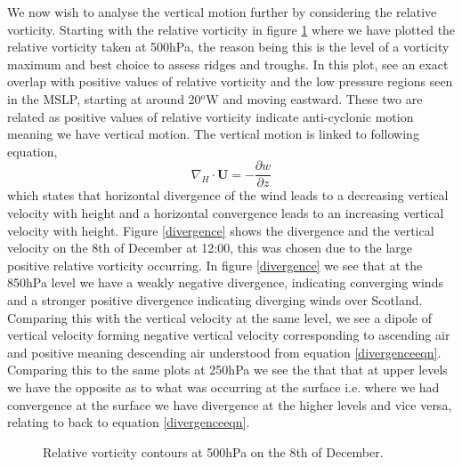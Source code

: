 \documentclass[12pt,a4paper]{article}
\begin{document}
We now wish to analyse the vertical motion further by considering the relative vorticity. Starting with the relative vorticity in figure \ref{relative vorticity} where we have plotted the relative vorticity taken at 500hPa, the reason being this is the level of a vorticity maximum and best choice to assess ridges and troughs. In this plot, see an exact overlap with positive values of relative vorticity and the low pressure regions seen in the MSLP, starting at around 20$^o$W and moving eastward. These two are related as positive values of relative vorticity indicate anti-cyclonic motion meaning we have vertical motion. The vertical motion is linked to following equation,
\begin{equation}
    \nabla_H \cdot\bm{U} = -\frac{\partial w}{\partial z}
    \label{divergenceeqn}
\end{equation}
which states that horizontal divergence of the wind leads to a decreasing vertical velocity with height and a horizontal convergence leads to an increasing vertical velocity with height. Figure \ref{divergence} shows the divergence and the vertical velocity on the 8th of December at 12:00, this was chosen due to the large positive relative vorticity occurring. In figure \ref{divergence} we see that at the 850hPa level we have a weakly negative divergence, indicating converging winds and a stronger positive divergence indicating diverging winds over Scotland. Comparing this with the vertical velocity at the same level, we see a dipole of vertical velocity forming negative vertical velocity corresponding to ascending air and positive meaning descending air understood from equation \eqref{divergenceeqn}.   
Comparing this to the same plots at 250hPa we see the that that at upper levels we have the opposite as to what was occurring at the surface i.e. where we had convergence at the surface we have divergence at the higher levels and vice versa, relating to back to equation \eqref{divergenceeqn}. 
\begin{figure}[H]
    \centering
        \centering
        \caption{Relative vorticity contours at 500hPa on the 8th of December.}
        \label{relative vorticity}
\end{figure}
\end{document}
